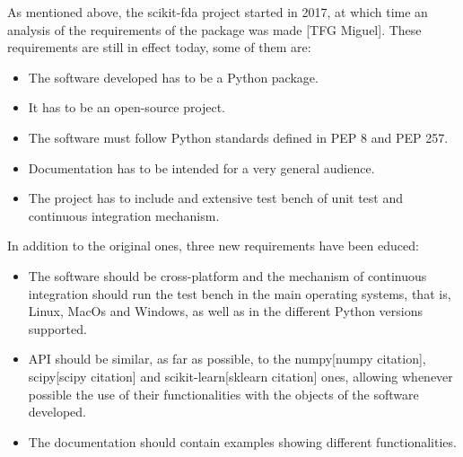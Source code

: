 
As mentioned above, the scikit-fda project started in 2017, at which time an
analysis of the requirements of the package was made [TFG Miguel]. These
requirements are still in effect today, some of them are:

\begin{itemize}
\item The software developed has to be a Python package.
\item It has to be an open-source project.
\item The software must follow Python standards defined in PEP 8 and PEP 257.
\item Documentation has to be intended for a very general audience.
\item The project has to include and extensive test bench of unit test and continuous integration mechanism.
\end{itemize}
In addition to the original ones, three new requirements have been educed:

\begin{itemize}
\item The software should be cross-platform and the mechanism of
 continuous integration should run the test bench in the main operating systems, that is, 
 Linux, MacOs and Windows, as well as in the different Python versions supported.
 
\item  API should be similar, as far as possible, to the numpy[numpy citation], scipy[scipy citation] and
 scikit-learn[sklearn citation] ones, allowing whenever possible the use of their functionalities with the
  objects of the software developed.
\item The documentation should contain examples showing different functionalities.
\end{itemize}
